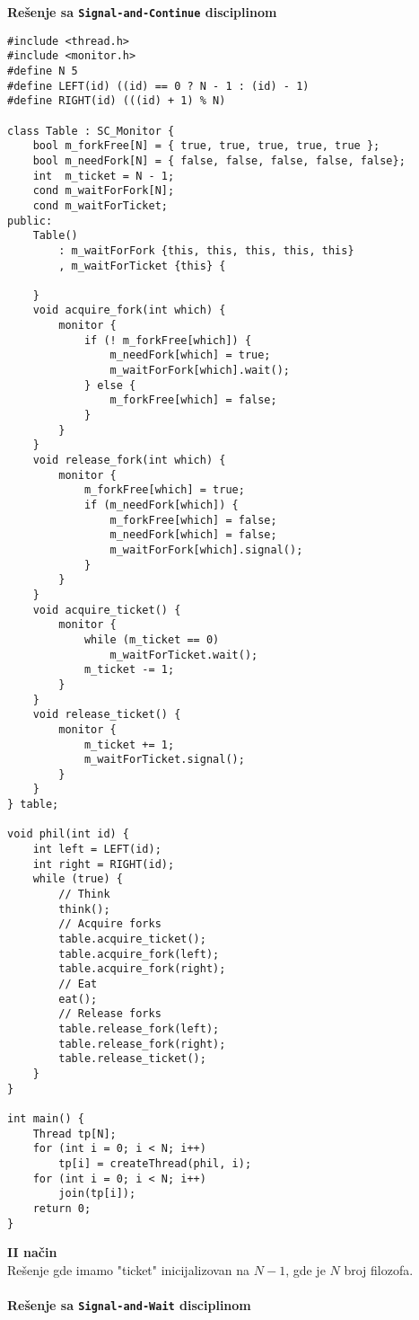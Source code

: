 \textbf{Re\v{s}enje sa \texttt{Signal-and-Continue} disciplinom}
\begin{lstlisting}
#include <thread.h>
#include <monitor.h>
#define N 5
#define LEFT(id) ((id) == 0 ? N - 1 : (id) - 1)
#define RIGHT(id) (((id) + 1) % N)

class Table : SC_Monitor {
    bool m_forkFree[N] = { true, true, true, true, true };
    bool m_needFork[N] = { false, false, false, false, false};
    int  m_ticket = N - 1;
    cond m_waitForFork[N];
    cond m_waitForTicket;
public:
    Table() 
        : m_waitForFork {this, this, this, this, this}
        , m_waitForTicket {this} {
        
    }
    void acquire_fork(int which) {
        monitor {
            if (! m_forkFree[which]) {
                m_needFork[which] = true;
                m_waitForFork[which].wait();
            } else {
                m_forkFree[which] = false;
            }
        }
    }
    void release_fork(int which) {
        monitor {
            m_forkFree[which] = true;
            if (m_needFork[which]) {
                m_forkFree[which] = false;
                m_needFork[which] = false;
                m_waitForFork[which].signal();
            }
        }
    }
    void acquire_ticket() {
        monitor {
            while (m_ticket == 0)
                m_waitForTicket.wait();
            m_ticket -= 1;
        }
    }
    void release_ticket() {
        monitor {
            m_ticket += 1;
            m_waitForTicket.signal();
        }
    }
} table;

void phil(int id) {
    int left = LEFT(id);
    int right = RIGHT(id);
    while (true) {
        // Think
        think();
        // Acquire forks
        table.acquire_ticket();
        table.acquire_fork(left);
        table.acquire_fork(right);
        // Eat
        eat();
        // Release forks
        table.release_fork(left);
        table.release_fork(right);
        table.release_ticket();
    }
}

int main() {
    Thread tp[N];
    for (int i = 0; i < N; i++) 
        tp[i] = createThread(phil, i);
    for (int i = 0; i < N; i++) 
        join(tp[i]);
    return 0;
}

\end{lstlisting}
\textbf{\large II na\v{c}in}\\
Re\v{s}enje gde imamo "ticket" inicijalizovan na $N-1$, gde je $N$ broj filozofa.
\\\\
\textbf{Re\v{s}enje sa \texttt{Signal-and-Wait} disciplinom}
